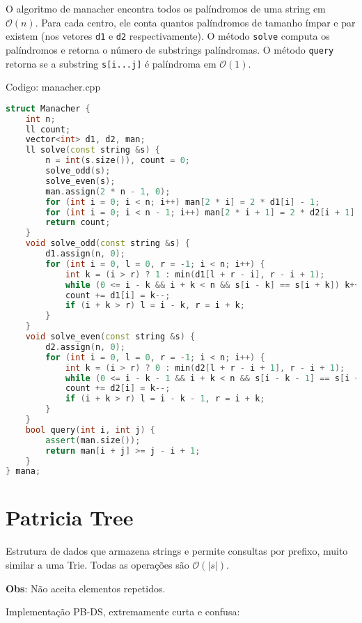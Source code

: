 \documentclass[10pt, a4paper, oneside]{book}
\begin{document}
O algoritmo de manacher encontra todos os palíndromos de uma string em $\mathcal{O}(n)$. Para cada centro, ele conta quantos palíndromos de tamanho ímpar e par existem (nos vetores \texttt{d1} e \texttt{d2} respectivamente). O método \texttt{solve} computa os palíndromos e retorna o número de substrings palíndromas. O método \texttt{query} retorna se a substring \texttt{s[i...j]} é palíndroma em $\mathcal{O}(1)$.
\hfill

Codigo: manacher.cpp

\begin{lstlisting}[language=C++]
struct Manacher {
    int n;
    ll count;
    vector<int> d1, d2, man;
    ll solve(const string &s) {
        n = int(s.size()), count = 0;
        solve_odd(s);
        solve_even(s);
        man.assign(2 * n - 1, 0);
        for (int i = 0; i < n; i++) man[2 * i] = 2 * d1[i] - 1;
        for (int i = 0; i < n - 1; i++) man[2 * i + 1] = 2 * d2[i + 1];
        return count;
    }
    void solve_odd(const string &s) {
        d1.assign(n, 0);
        for (int i = 0, l = 0, r = -1; i < n; i++) {
            int k = (i > r) ? 1 : min(d1[l + r - i], r - i + 1);
            while (0 <= i - k && i + k < n && s[i - k] == s[i + k]) k++;
            count += d1[i] = k--;
            if (i + k > r) l = i - k, r = i + k;
        }
    }
    void solve_even(const string &s) {
        d2.assign(n, 0);
        for (int i = 0, l = 0, r = -1; i < n; i++) {
            int k = (i > r) ? 0 : min(d2[l + r - i + 1], r - i + 1);
            while (0 <= i - k - 1 && i + k < n && s[i - k - 1] == s[i + k]) k++;
            count += d2[i] = k--;
            if (i + k > r) l = i - k - 1, r = i + k;
        }
    }
    bool query(int i, int j) {
        assert(man.size());
        return man[i + j] >= j - i + 1;
    }
} mana;\end{lstlisting}
\hfill

\section{Patricia Tree}


Estrutura de dados que armazena strings e permite consultas por prefixo, muito similar a uma Trie. Todas as operações são $\mathcal{O}(|s|)$.



\textbf{Obs}: Não aceita elementos repetidos.



Implementação PB-DS, extremamente curta e confusa:
\end{document}
